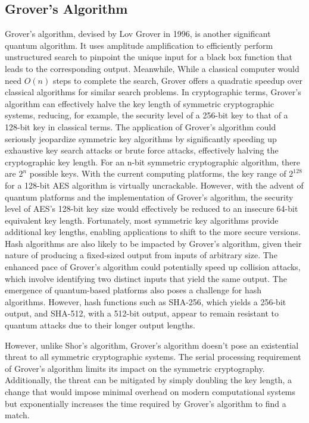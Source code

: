 \subsection{Grover's Algorithm}
Grover's algorithm, devised by Lov Grover in 1996, is another significant quantum algorithm. It uses amplitude amplification to efficiently perform unstructured search to pinpoint the unique input for a black box function that leads to the corresponding output. Meanwhile, While a classical computer would need $O(n)$ steps to complete the search, Grover offers a quadratic speedup over classical algorithms for similar search problems. In cryptographic terms, Grover's algorithm can effectively halve the key length of symmetric cryptographic systems, reducing, for example, the security level of a 256-bit key to that of a 128-bit key in classical terms.
The application of Grover's algorithm could seriously jeopardize symmetric key algorithms by significantly speeding up exhaustive key search attacks or brute force attacks, effectively halving the cryptographic key length. For an n-bit symmetric cryptographic algorithm, there are $2^n$ possible keys. With the current computing platforms, the key range of $2^128$ for a 128-bit AES algorithm is virtually uncrackable. However, with the advent of quantum platforms and the implementation of Grover's algorithm, the security level of AES's 128-bit key size would effectively be reduced to an insecure 64-bit equivalent key length. Fortunately, most symmetric key algorithms provide additional key lengths, enabling applications to shift to the more secure versions.
Hash algorithms are also likely to be impacted by Grover's algorithm, given their nature of producing a fixed-sized output from inputs of arbitrary size. The enhanced pace of Grover's algorithm could potentially speed up collision attacks, which involve identifying two distinct inputs that yield the same output. The emergence of quantum-based platforms also poses a challenge for hash algorithms. However, hash functions such as SHA-256, which yields a 256-bit output, and SHA-512, with a 512-bit output, appear to remain resistant to quantum attacks due to their longer output lengths.

However, unlike Shor's algorithm, Grover's algorithm doesn't pose an existential threat to all symmetric cryptographic systems. The serial processing requirement of Grover's algorithm limits its impact on the symmetric cryptography. Additionally, the threat can be mitigated by simply doubling the key length, a change that would impose minimal overhead on modern computational systems but exponentially increases the time required by Grover's algorithm to find a match.

